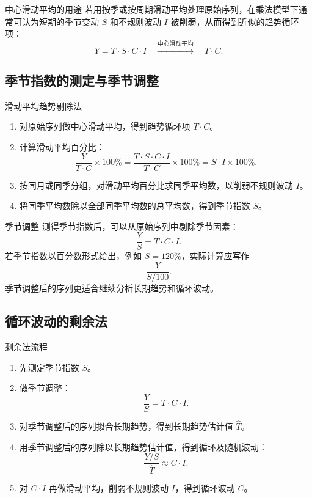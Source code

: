 \documentclass[UTF8,zihao=-4,fontset=fandol]{ctexart}
\begin{document}
\begin{methodbox}{中心滑动平均的用途}
若用按季或按周期滑动平均处理原始序列，在乘法模型下通常可认为短期的季节变动 $S$ 和不规则波动 $I$ 被削弱，从而得到近似的趋势循环项：
\[
Y=T\cdot S\cdot C\cdot I
\quad \xrightarrow{\text{中心滑动平均}} \quad
T\cdot C.
\]
\end{methodbox}

\subsection{季节指数的测定与季节调整}

\begin{methodbox}{滑动平均趋势剔除法}
\begin{enumerate}
  \item 对原始序列做中心滑动平均，得到趋势循环项 $T\cdot C$。
  \item 计算滑动平均百分比：
  \[
  \frac{Y}{T\cdot C}\times 100\%
  =
  \frac{T\cdot S\cdot C\cdot I}{T\cdot C}\times 100\%
  =
  S\cdot I\times 100\%.
  \]
  \item 按同月或同季分组，对滑动平均百分比求同季平均数，以削弱不规则波动 $I$。
  \item 将同季平均数除以全部同季平均数的总平均数，得到季节指数 $S$。
\end{enumerate}
\end{methodbox}

\begin{keybox}{季节调整}
测得季节指数后，可以从原始序列中剔除季节因素：
\[
\frac{Y}{S}=T\cdot C\cdot I.
\]
若季节指数以百分数形式给出，例如 $S=120\%$，实际计算应写作
\[
\frac{Y}{S/100}.
\]
季节调整后的序列更适合继续分析长期趋势和循环波动。
\end{keybox}

\subsection{循环波动的剩余法}

\begin{methodbox}{剩余法流程}
\begin{enumerate}
  \item 先测定季节指数 $S$。
  \item 做季节调整：
  \[
  \frac{Y}{S}=T\cdot C\cdot I.
  \]
  \item 对季节调整后的序列拟合长期趋势，得到长期趋势估计值 $\hat T$。
  \item 用季节调整后的序列除以长期趋势估计值，得到循环及随机波动：
  \[
  \frac{Y/S}{\hat T}\approx C\cdot I.
  \]
  \item 对 $C\cdot I$ 再做滑动平均，削弱不规则波动 $I$，得到循环波动 $C$。
\end{enumerate}
\end{methodbox}
\end{document}
